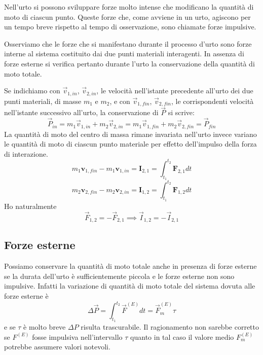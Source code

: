 \documentclass[class=book, crop=false, oneside, 12pt]{standalone}
\begin{document}
Nell'urto si possono sviluppare forze molto intense che modificano la quantità di moto di ciascun punto.
Queste forze che, come avviene in un urto, agiscono per un tempo breve rispetto al tempo di osservazione, sono chiamate forze impulsive.

Osserviamo che le forze che si manifestano durante il processo d'urto sono forze interne al sistema costituito dai due punti materiali interagenti. 
In assenza di forze esterne si verifica pertanto durante l'urto la conservazione della quantità di moto totale.

Se indichiamo con \(\overrightarrow{v}_{1,in}\), \(\overrightarrow{v}_{2,in}\), le velocità nell'istante precedente all'urto dei due punti materiali, di masse \(m_1\) e \(m_2\), e con \(\overrightarrow{v}_{1,fin}\), \(\overrightarrow{v}_{2,fin}\), le corrispondenti velocità nell'istante successivo all'urto, la conservazione di \(\overrightarrow{P}\) si scrive:
\begin{equation}
    \overrightarrow{P}_{in} = m_1 \overrightarrow{v}_{1,in} + m_2 \overrightarrow{v}_{2,in} = m_1 \overrightarrow{v}_{1,fin} + m_2 \overrightarrow{v}_{2,fin} = \overrightarrow{P}_{fin}
\end{equation}
La quantità di moto del centro di massa rimane invariata nell'urto invece variano le quantità di moto di ciascun punto materiale per effetto dell'impulso della forza di interazione.
\begin{equation*}
    m_{1} \boldsymbol{v}_{1, fin}-m_{1} \boldsymbol{v}_{1, in}=\mathbf{I}_{2,1}=\int_{t_1}^{t_2} \mathbf{F}_{2,1} d t
\end{equation*}
\begin{equation*}
    m_{2} \boldsymbol{v}_{2, fin}-m_{2} \boldsymbol{v}_{2, in}=\mathbf{I}_{1,2}=\int_{t_1}^{t_2} \mathbf{F}_{1,2} d t
\end{equation*}
Ho naturalmente
\begin{equation*}
    \overrightarrow{F}_{1,2} = - \overrightarrow{F}_{2,1} \implies \overrightarrow{I}_{1,2} = - \overrightarrow{I}_{2,1}
\end{equation*}

\subsection{Forze esterne}

Possiamo conservare la quantità di moto totale anche in presenza di forze esterne se la durata dell'urto è sufficientemente piccola e le forze esterne non sono impulsive.
Infatti la variazione di quantità di moto totale del sistema dovuta alle forze esterne è
\begin{equation*}
    \Delta \overrightarrow{P} = \int_{t_1}^{t_2} \overrightarrow{F}^{(E)} dt = \overrightarrow{F}_m^{(E)} \tau
\end{equation*}
e se \(\tau\) è molto breve \(\Delta P\) risulta trascurabile.
Il ragionamento non sarebbe corretto se \(F^{(E)}\) fosse impulsiva nell'intervallo \(\tau\) quanto in tal caso il valore medio \(F_m^{(E)}\) potrebbe assumere valori notevoli.
\end{document}
